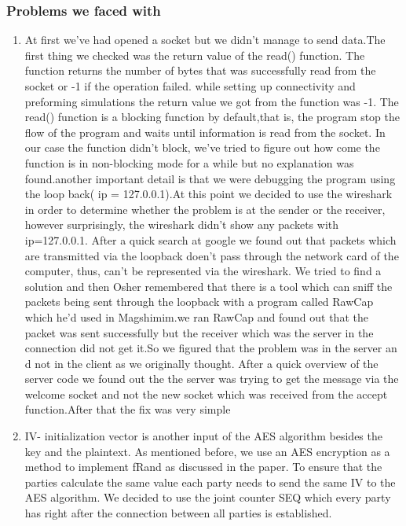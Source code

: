 \documentclass[12pt]{article}
\begin{document}
\subsubsection{Problems we faced with}
\begin{enumerate}
	\item 
	At first we’ve had opened a socket but we didn’t manage to send data.The first thing we checked was the return value of the read() function. The function returns the number of bytes that was successfully read from the socket or -1 if the operation failed. while setting up connectivity and preforming simulations the return value we got from the function was -1. The read() function is a blocking function by default,that is, the program stop the flow of the program and waits until information is read from the socket. In our case the function didn’t block, we’ve tried to figure out how come the function is in non-blocking mode for a while but no explanation was found.another important detail is that we were debugging the program using the loop back( ip = 127.0.0.1).At this point we decided to use the wireshark in order to determine whether the problem is at the sender or the receiver, however surprisingly, the wireshark didn’t show any packets with ip=127.0.0.1. After a quick search at google we found out that packets which are transmitted via the loopback doen’t pass through the network card of the computer, thus, can’t be represented via the wireshark. We tried to find a solution and then Osher remembered that there is a tool which can sniff the packets being sent through the loopback with a program called RawCap which he’d used in Magshimim.we ran RawCap and found out that the packet was sent successfully but the receiver which was the server in the connection did not get it.So we figured that the problem was in the server an d not in the client as we originally thought. After a quick overview of the server code we found out the the server was trying to get the message via the welcome socket and not the new socket which was received from the accept function.After that the fix was very simple
	\item IV- initialization vector is another input of the AES algorithm besides the key and the plaintext. As mentioned before, we use an AES encryption as a method to implement fRand as discussed in the paper. To ensure that the parties calculate the same value each party needs to send the same IV to the AES algorithm. We decided to use the joint counter SEQ which every party has right after the connection between all parties is established.

\end{enumerate}
\end{document}
